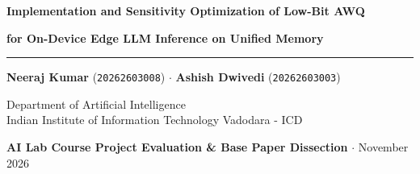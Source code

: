 \documentclass[aspectratio=169, 10pt]{beamer}
\begin{document}
\begin{frame}
  \centering
  \vspace{0.7cm}
  {\LARGE \textbf{Implementation and Sensitivity Optimization of Low-Bit AWQ}}\par
  \vspace{0.2cm}
  {\large \textbf{for On-Device Edge LLM Inference on Unified Memory}}\par
  \vspace{0.3cm}
  \rule{0.5\linewidth}{0.6pt}\par
  \vspace{0.3cm}
  {\normalsize \textbf{Neeraj Kumar} (\texttt{20262603008}) \quad $\cdot$ \quad \textbf{Ashish Dwivedi} (\texttt{20262603003})}\par
  \vspace{0.12cm}
  {\footnotesize Department of Artificial Intelligence \\ Indian Institute of Information Technology Vadodara - ICD}\par
  \vspace{0.35cm}
  {\scriptsize \textbf{AI Lab Course Project Evaluation \& Base Paper Dissection} \quad $\cdot$ \quad November 2026}
\end{frame}
\end{document}
